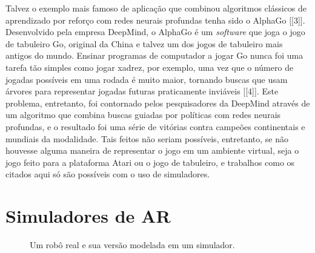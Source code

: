 \documentclass[cic,tc]{iiufrgs}
\begin{document}
Talvez o exemplo mais famoso de aplicação que combinou algoritmos clássicos de
aprendizado por reforço com redes neurais profundas tenha sido o AlphaGo [[3]].
Desenvolvido pela empresa DeepMind, o AlphaGo é um \textit{software} que joga o
jogo de tabuleiro Go, original da China e talvez um dos jogos de tabuleiro mais
antigos do mundo. Ensinar programas de computador a jogar Go nunca foi uma
tarefa tão simples como jogar xadrez, por exemplo, uma vez que o número de
jogadas possíveis em uma rodada é muito maior, tornando buscas que usam árvores
para representar jogadas futuras praticamente inviáveis [[4]]. Este problema,
entretanto, foi contornado pelos pesquisadores da DeepMind através de um
algoritmo que combina buscas guiadas por políticas com redes neurais profundas,
e o resultado foi uma série de vitórias contra campeões continentais e mundiais
da modalidade. Tais feitos não seriam possíveis, entretanto, se não houvesse
alguma maneira de representar o jogo em um ambiente virtual, seja o jogo feito
para a plataforma Atari ou o jogo de tabuleiro, e trabalhos como os citados aqui
só são possíveis com o uso de simuladores.



\section{Simuladores de AR}
\label{simuladores_ar}

\begin{figure}[h]
    \caption{Um robô real e sua versão modelada em um simulador.}
    \begin{center}
    \end{center}
    \label{fig:mujocosimulator}
\end{figure}
\end{document}
